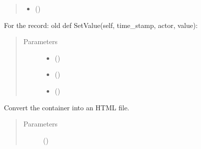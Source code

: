 \documentclass[letterpaper,10pt,openany,oneside,english]{sphinxmanual}
\begin{document}
\begin{fulllineitems}
\begin{fulllineitems}
\begin{quote}
\begin{description}
\begin{itemize}
\item {} 
 () \textendash{} 

\end{itemize}

\end{description}\end{quote}

\end{fulllineitems}


\begin{fulllineitems}
\label{\detokenize{support_rst/phase:phase.Phase.SetValue}}
For the record: old def SetValue(self, time\_stamp, actor, value):
\begin{quote}\begin{description}
\item[{Parameters}] \leavevmode\begin{itemize}
\item {} 
 () \textendash{} 

\item {} 
 () \textendash{} 

\item {} 
 () \textendash{} 

\end{itemize}

\end{description}\end{quote}

\end{fulllineitems}


\begin{fulllineitems}
\label{\detokenize{support_rst/phase:phase.Phase.WriteHTML}}
Convert the  container into an HTML file.
\begin{quote}\begin{description}
\item[{Parameters}] \leavevmode
{} () \textendash{} 


\end{description}
\end{quote}
\end{fulllineitems}
\end{fulllineitems}
\end{document}
